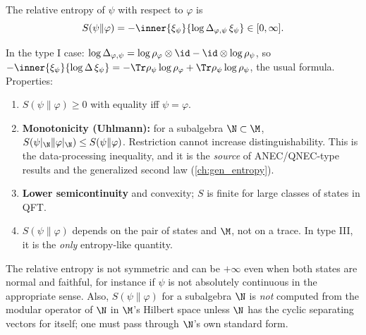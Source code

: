 \begin{definition}[Araki]
The relative entropy of $\psi$ with respect to $\varphi$ is
\begin{equation}
S(\psi\|\varphi)=-\inner{\xi_\psi}{\log\Delta_{\varphi,\psi}\,\xi_\psi}\in[0,\infty].
\end{equation}
\end{definition}
In the type I case: $\log\Delta_{\varphi,\psi}=\log\rho_\varphi\otimes\id-\id\otimes\log\rho_\psi$, so $-\inner{\xi_\psi}{\log\Delta\,\xi_\psi}=-\Tr\rho_\psi\log\rho_\varphi+\Tr\rho_\psi\log\rho_\psi$, the usual formula. Properties:
\begin{enumerate}
\item $S(\psi\|\varphi)\ge0$ with equality iff $\psi=\varphi$.
\item \textbf{Monotonicity (Uhlmann):} for a subalgebra $\N\subset\M$, $S(\psi|_\N\|\varphi|_\N)\le S(\psi\|\varphi)$. Restriction cannot increase distinguishability. This is the data-processing inequality, and it is the \emph{source} of ANEC/QNEC-type results and the generalized second law (\cref{ch:gen_entropy}).
\item \textbf{Lower semicontinuity} and convexity; $S$ is finite for large classes of states in QFT.
\item $S(\psi\|\varphi)$ depends on the pair of states and $\M$, not on a trace. In type III, it is the \emph{only} entropy-like quantity.
\end{enumerate}

\begin{whatwrong}
The relative entropy is not symmetric and can be $+\infty$ even when both states are normal and faithful, for instance if $\psi$ is not absolutely continuous in the appropriate sense. Also, $S(\psi\|\varphi)$ for a subalgebra $\N$ is \emph{not} computed from the modular operator of $\N$ in $\M$'s Hilbert space unless $\N$ has the cyclic separating vectors for itself; one must pass through $\N$'s own standard form.
\end{whatwrong}

